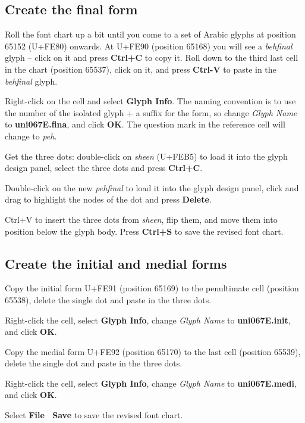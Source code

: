 \subsection{Create the final form}

Roll the font chart up a bit until you come to a set of Arabic glyphs at position 65152 (U+FE80) onwards.  At U+FE90 (position 65168) you will see a \textit{behfinal} glyph -- click on it and press \textbf{Ctrl+C} to copy it.  Roll down to the third last cell in the chart (position 65537), click on it, and press \textbf{Ctrl-V} to paste in the \textit{behfinal} glyph.

Right-click on the cell and select \textbf{Glyph Info}.  The naming convention is to use the number of the isolated glyph + a suffix for the form, so change \textit{Glyph Name} to \textbf{uni067E.fina},  and click \textbf{OK}.  The question mark in the reference cell will change to \textit{peh}.

Get the three dots: double-click on \textit{sheen} (U+FEB5) to load it into the glyph design panel, select the three dots and press \textbf{Ctrl+C}.

Double-click on the new \textit{pehfinal} to load it into the glyph design panel, click and drag to highlight the nodes of the dot and press \textbf{Delete}.

Ctrl+V to insert the three dots from \textit{sheen}, flip them, and move them into position below the glyph body.  Press \textbf{Ctrl+S} to save the revised font chart.

\subsection{Create the initial and medial forms}

Copy the initial form U+FE91 (position 65169) to the penultimate cell (position 65538), delete the single dot and paste in the three dots.

Right-click the cell, select \textbf{Glyph Info}, change \textit{Glyph Name} to \textbf{uni067E.init}, and click \textbf{OK}.

Copy the medial form U+FE92 (position 65170) to the last cell (position 65539), delete the single dot and paste in the three dots.

Right-click the cell, select \textbf{Glyph Info}, change \textit{Glyph Name} to \textbf{uni067E.medi}, and click \textbf{OK}.

Select \textbf{File \textrightarrow\ Save} to save the revised font chart.

